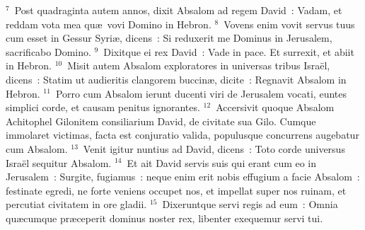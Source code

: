 ${}^{7}$~Post quadraginta autem annos, dixit Absalom ad regem David~: Vadam, et reddam vota mea qu\ae\ vovi Domino in Hebron.
${}^{8}$~Vovens enim vovit servus tuus cum esset in Gessur Syri\ae , dicens~: Si reduxerit me Dominus in Jerusalem, sacrificabo Domino.
${}^{9}$~Dixitque ei rex David~: Vade in pace. Et surrexit, et abiit in Hebron.
${}^{10}$~Misit autem Absalom exploratores in universas tribus Isra\"el, dicens~: Statim ut audieritis clangorem buccin\ae , dicite~: Regnavit Absalom in Hebron.
${}^{11}$~Porro cum Absalom ierunt ducenti viri de Jerusalem vocati, euntes simplici corde, et causam penitus ignorantes.
${}^{12}$~Accersivit quoque Absalom Achitophel Gilonitem consiliarium David, de civitate sua Gilo. Cumque immolaret victimas, facta est conjuratio valida, populusque concurrens augebatur cum Absalom.
${}^{13}$~Venit igitur nuntius ad David, dicens~: Toto corde universus Isra\"el sequitur Absalom.
${}^{14}$~Et ait David servis suis qui erant cum eo in Jerusalem~: Surgite, fugiamus~: neque enim erit nobis effugium a facie Absalom~: festinate egredi, ne forte veniens occupet nos, et impellat super nos ruinam, et percutiat civitatem in ore gladii.
${}^{15}$~Dixeruntque servi regis ad eum~: Omnia qu\ae cumque pr\ae ceperit dominus noster rex, libenter exequemur servi tui.


